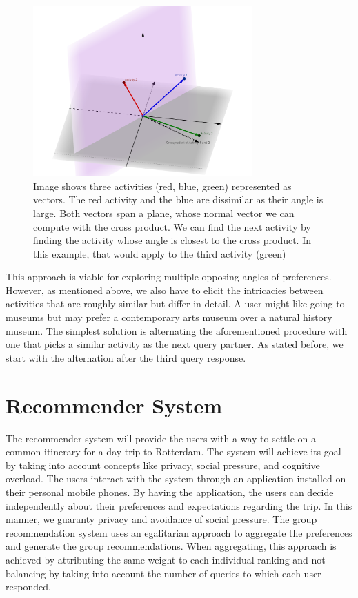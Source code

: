 \documentclass[11pt,a4paper,oneside]{article}
\begin{document}
\begin{figure}[H]
    \centering
    \includegraphics[width=0.75\textwidth]{paper/imgs/geogebra-export.png}
    \caption{Image shows three activities (red, blue, green) represented as vectors. The red activity and the blue are dissimilar as their angle is large. Both vectors span a plane, whose normal vector we can compute with the cross product. We can find the next activity by finding the activity whose angle is closest to the cross product. In this example, that would apply to the third activity (green)}
    \label{fig:item_vectors}
\end{figure}

This approach is viable for exploring multiple opposing angles of preferences. However, as mentioned above, we also have to elicit the intricacies between activities that are roughly similar but differ in detail. A user might like going to museums but may prefer a contemporary arts museum over a natural history museum. The simplest solution is alternating the aforementioned procedure with one that picks a similar activity as the next query partner. As stated before, we start with the alternation after the third query response. 



\section{Recommender System}
\label{sec:rs}
The recommender system will provide the users with a way to settle on a common itinerary for a day trip to Rotterdam. The system will achieve its goal by taking into account concepts like privacy, social pressure, and cognitive overload. The users interact with the system through an application installed on their personal mobile phones. By having the application, the users can decide independently about their preferences and expectations regarding the trip. In this manner, we guaranty privacy and avoidance of social pressure. The group recommendation system uses an egalitarian approach to aggregate the preferences and generate the group recommendations. When aggregating, this approach is achieved by attributing the same weight to each individual ranking and not balancing by taking into account the number of queries to which each user responded.
\end{document}
